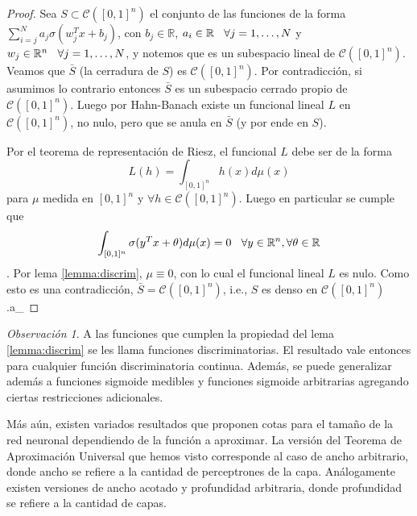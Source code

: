 \documentclass[letterpaper,11pt]{article} %
\def\espacio{\hspace{.25cm}\,}
\theoremstyle{defbreak}
\theoremstyle{propbreak}
\theoremstyle{remark}
\newtheorem{remark}{Observación}[subsection]
\theoremstyle{break}
\def\R{\mathbb{R}}
\def\gris{\color{mygray}}
\def\negro{\color{black}}
\def\findem{\null\hfill\color{white}a\color{black}_\square}
\begin{document}
\begin{proof}
\gris
Sea $S\subset\mathcal{C}([0,1]^n)$ el conjunto de las funciones de la forma $\displaystyle \sum^N_{i=j}a_j\sigma(w^T_jx+b_j)$, con  $b_j\in\R$, $a_i\in\R\espacio \forall j=1,\dots,N$ y $w_j\in\R^n\espacio\forall j=1,\dots,N$, y notemos que es un subespacio lineal de $\mathcal{C}([0,1]^n)$. Veamos que $\bar S$ (la cerradura de $S$) es $\mathcal{C}([0,1]^n)$. Por contradicción, si asumimos lo contrario entonces $\bar S$ es un subespacio cerrado propio de $\mathcal{C}([0,1]^n)$. Luego por Hahn-Banach existe un funcional lineal $L$ en $\mathcal{C}([0,1]^n)$, no nulo, pero que se anula en $\bar S$ (y por ende en $S$).

\newp Por el teorema de representación de Riesz, el funcional $L$ debe ser de la forma
$$ L(h) = \displaystyle\int_{[0,1]^n}h(x)d\mu(x)$$
para $\mu$ medida en $[0,1]^n$ y $\forall h\in \mathcal{C}([0,1]^n)$. Luego en particular se cumple que
$$\int_{[0,1]^n}\sigma(y^Tx+\theta)d\mu(x)=0 \espacio \forall y\in\R^n,\forall\theta \in\R$$. Por lema \ref{lemma:discrim}, $\mu\equiv 0$, con lo cual el funcional lineal $L$ es nulo. Como esto es una contradicción, $\bar S = \mathcal{C}([0,1]^n)$, i.e., $S$ es denso en $\mathcal{C}([0,1]^n)$.\findem
\negro
\end{proof}
\begin{remark}
A las funciones que cumplen la propiedad del lema \ref{lemma:discrim} se les llama funciones discriminatorias. El resultado vale entonces para cualquier función discriminatoria continua. Además, se puede generalizar además a funciones sigmoide medibles y funciones sigmoide arbitrarias agregando ciertas restricciones adicionales.

Más aún, existen variados resultados que proponen cotas para el tamaño de la red neuronal dependiendo de la función a aproximar. La versión del Teorema de Aproximación Universal que hemos visto corresponde al caso de ancho arbitrario, donde ancho se refiere a la cantidad de perceptrones de la capa. Análogamente existen versiones de ancho acotado y profundidad arbitraria, donde profundidad se refiere a la cantidad de capas.
\end{remark}
\end{document}
